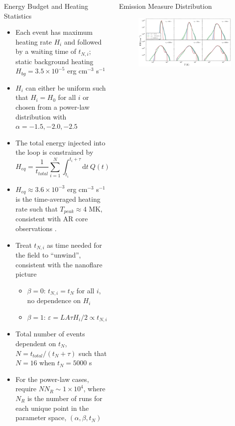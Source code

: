 \documentclass[final]{beamer}
\begin{document}
\begin{frame}
\begin{columns}[t]
\begin{column}{0.49\linewidth}
\begin{block}{Energy Budget and Heating Statistics}
\begin{itemize}
        \item Each event has maximum heating rate $H_i$ and followed by a waiting time of $t_{N,i}$; static background heating $H_{bg}=3.5\times10^{-5}$ erg cm$^{-3}$ s$^{-1}$
        \item $H_i$ can either be uniform such that $H_i=H_0$ for all $i$ or chosen from a power-law distribution with $\alpha=-1.5,-2.0,-2.5$
        \item The total energy injected into the loop is constrained by
          \begin{equation}
            H_{eq} = \frac{1}{t_{total}}\sum_{i=1}^N\int_{t_i}^{t_i+\tau}\mathrm{d}t~Q(t) = \frac{\tau}{2t_{total}}\sum_{i=1}^NH_i,
          \end{equation}
        \item $H_{eq}\approx3.6\times10^{-3}$ erg cm$^{-3}$ s$^{-1}$ is the time-averaged heating rate such that $T_{peak}\approx4$ MK, consistent with AR core observations \citep{warren_systematic_2012}.
        \item Treat $t_{N,i}$ as time needed for the field to ``unwind'', consistent with the \citet{parker_nanoflares_1988} nanoflare picture
        \begin{itemize}
          \item $\beta=0$: $t_{N,i}=t_N$ for all $i$, no dependence on $H_i$
          \item $\beta=1$: $\varepsilon=LA\tau H_i/2\propto t_{N,i}$
        \end{itemize}
        \item Total number of events dependent on $t_N$, $N=t_{total}/(t_N + \tau)$ such that $N=16$ when $t_N=5000$ s
        \item For the power-law cases, require $NN_R\sim1\times10^4$, where $N_R$ is the number of runs for each unique point in the parameter space, $(\alpha,\beta,t_N)$
      \end{itemize}
    \end{block}
  \end{column}
  \begin{column}{0.49\linewidth}
    \begin{block}{Emission Measure Distribution}
      \begin{figure}
        \centering
        \includegraphics[width=\columnwidth]{figures/em_grid_electron_a25.pdf}

\end{figure}
\end{block}
\end{column}
\end{columns}
\end{frame}
\end{document}
